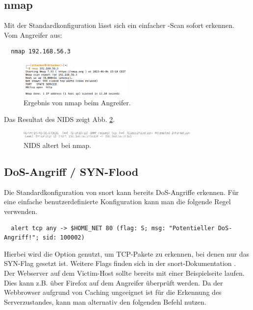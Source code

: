 \subsection{nmap}
Mit der Standardkonfiguration lässt sich ein einfacher -Scan sofort erkennen.\\
Vom Angreifer aus:
\begin{verbatim}
  nmap 192.168.56.3
\end{verbatim}

\begin{figure}[H]
  \centering
  \includegraphics[width=0.5\textwidth]{graphics/attacks/nmap-kali-working.png}
  \caption{Ergebnis von nmap beim Angreifer.}\label{fig:nmap2}
\end{figure}

Das Resultat des NIDS zeigt Abb. \ref{fig:nmap1}.

\begin{figure}[H]
  \centering
  \includegraphics[width=0.8\textwidth]{graphics/attacks/nmap.png}
  \caption{NIDS altert bei nmap.}\label{fig:nmap1}
\end{figure}

\subsection{DoS-Angriff / SYN-Flood}\label{sec:dos}

Die Standardkonfiguration von snort kann bereits DoS-Angriffe erkennen. Für eine einfache benutzerdefinierte Konfiguration kann man die folgende Regel verwenden.

\begin{verbatim}
  alert tcp any -> $HOME_NET 80 (flag: S; msg: "Potentieller DoS-Angriff!"; sid: 100002)
\end{verbatim}

Hierbei wird die Option  genutzt, um TCP-Pakete zu erkennen, bei denen nur das SYN-Flag gesetzt ist. Weitere Flags finden sich in der snort-Dokumentation \cite{snortflag}.\\

Der Webserver auf dem Victim-Host sollte bereits mit einer Beispielseite laufen. Dies kann z.B. über Firefox auf dem Angreifer überprüft werden. Da der Webbrowser aufgrund von Caching ungeeignet ist für die Erkennung des Serverzustandes, kann man alternativ den folgenden Befehl nutzen.

